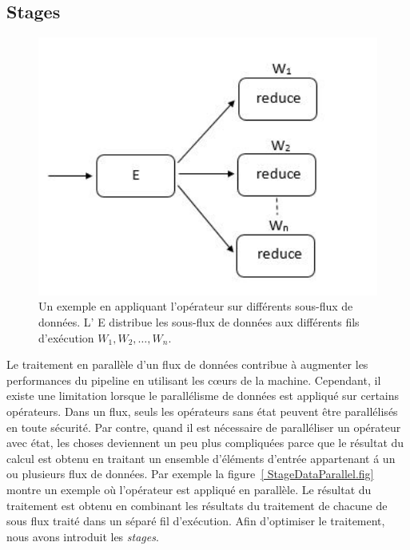 \subsection{Stages}



\begin{figure}[ht]
\centering
     \includegraphics[width=1.0\textwidth]{Figures/StageDataParallel.jpg}
      \caption{Un exemple en appliquant l'op\'erateur  sur diff\'erents sous-flux de donn\'ees. L' E distribue  les sous-flux de donn\'ees aux diff\'erents fils d'ex\'ecution $W_1, W_2, \ldots, W_n$.}
       \label{StageDataParallel.fig}
\end{figure}

Le traitement en parall\`ele d'un flux de donn\'ees contribue \`a augmenter les performances du pipeline en utilisant les cœurs de la machine. Cependant, il existe une limitation lorsque le parall\'elisme de donn\'ees est appliqu\'e sur certains op\'erateurs. Dans un flux, seuls les op\'erateurs sans \'etat peuvent \^etre parall\'elis\'es en toute s\'ecurit\'e. Par contre, quand il est n\'ecessaire de parall\'eliser un op\'erateur avec \'etat, les choses deviennent un peu plus compliqu\'ees parce que le r\'esultat du calcul est obtenu en traitant un ensemble d'\'el\'ements d'entrée appartenant \'a un ou plusieurs flux de donn\'ees. Par exemple la figure~\ref{ StageDataParallel.fig} montre un exemple o\`u l'op\'erateur  est appliqu\'e en parall\`ele. Le r\'esultat du traitement est obtenu en combinant les r\'esultats du traitement de chacune de sous flux trait\'e dans un s\'epar\'e fil d'ex\'ecution. Afin d'optimiser le traitement, nous avons introduit les \emph{stages}.

